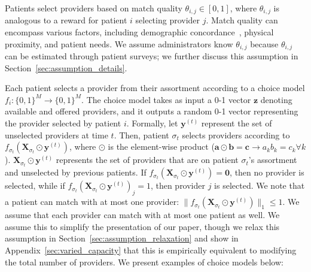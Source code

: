 \documentclass[11pt]{article}
\begin{document}
Patients select providers based on match quality $\theta_{i,j} \in [0,1]$, where $\theta_{i,j}$ is analogous to a reward for patient $i$ selecting provider $j$. 
Match quality can encompass various factors, including demographic concordance~\citep{race_concordance,gender_concordance,language_concordance}, physical proximity, and patient needs.
We assume administrators know $\theta_{i,j}$ because $\theta_{i,j}$ can be estimated through patient surveys; we further discuss this assumption in Section~\ref{sec:assumption_details}. 

Each patient selects a provider from their assortment according to a choice model $f_{i}: \{0,1\}^{M} \rightarrow \{0,1\}^{M}$. 
The choice model takes as input a 0-1 vector $\mathbf{z}$ denoting available and offered providers, and it outputs a random 0-1 vector representing the provider selected by patient $i$. 
Formally, let $\mathbf{y}^{(t)}$ represent the set of unselected providers at time $t$. 
Then, patient $\sigma_{t}$ selects providers according to $f_{\sigma_{t}}(\mathbf{X}_{\sigma_{t}} \odot \mathbf{y}^{(t)})$, where $\odot$ is the element-wise product ($\mathbf{a} \odot \mathbf{b} = \mathbf{c} \rightarrow a_{k} b_{k} = c_{k} \forall k$). 
$\mathbf{X}_{\sigma_{t}} \odot \mathbf{y}^{(t)}$ represents the set of providers that are on patient $\sigma_{t}$'s assortment and unselected by previous patients. 
If $f_{\sigma_{t}}(\mathbf{X}_{\sigma_{t}} \odot \mathbf{y}^{(t)}) = \mathbf{0}$, then no provider is selected, while if $f_{\sigma_{t}}(\mathbf{X}_{\sigma_{t}} \odot \mathbf{y}^{(t)})_{j} = 1$, then provider $j$ is selected. 
We note that a patient can match with at most one provider: $\lVert f_{\sigma_{t}}(\mathbf{X}_{\sigma_{t}} \odot \mathbf{y}^{(t)})\rVert_{1} \leq 1$. 
We assume that each provider can match with at most one patient as well. 
We assume this to simplify the presentation of our paper, though we relax this assumption in Section~\ref{sec:assumption_relaxation} and show in Appendix~\ref{sec:varied_capacity} that this is empirically equivalent to modifying the total number of providers.
We present examples of choice models below: 
\end{document}
